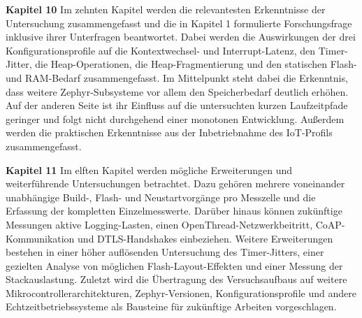 \noindent\textbf{Kapitel 10}\quad
Im zehnten Kapitel werden die relevantesten Erkenntnisse der Untersuchung zusammengefasst und die in Kapitel 1 formulierte Forschungsfrage inklusive ihrer Unterfragen beantwortet. Dabei werden die Auswirkungen der drei Konfigurationsprofile auf die Kontextwechsel- und Interrupt-Latenz, den Timer-Jitter, die Heap-Operationen, die Heap-Fragmentierung und den statischen Flash- und RAM-Bedarf zusammengefasst. Im Mittelpunkt steht dabei die Erkenntnis, dass weitere Zephyr-Subsysteme vor allem den Speicherbedarf deutlich erh{\"o}hen. Auf der anderen Seite ist ihr Einfluss auf die untersuchten kurzen Laufzeitpfade geringer und folgt nicht durchgehend einer monotonen Entwicklung. Au{\ss}erdem werden die praktischen Erkenntnisse aus der Inbetriebnahme des IoT-Profils zusammengefasst.

\noindent\textbf{Kapitel 11}\quad
Im elften Kapitel werden m{\"o}gliche Erweiterungen und weiterf{\"u}hrende Untersuchungen betrachtet. Dazu geh{\"o}ren mehrere voneinander unabh{\"a}ngige Build-, Flash- und Neustartvorg{\"a}nge pro Messzelle und die Erfassung der kompletten Einzelmesswerte. Dar{\"u}ber hinaus k{\"o}nnen zuk{\"u}nftige Messungen aktive Logging-Lasten, einen OpenThread-Netzwerkbeitritt, CoAP-Kommunikation und DTLS-Handshakes einbeziehen. Weitere Erweiterungen bestehen in einer h{\"o}her aufl{\"o}senden Untersuchung des Timer-Jitters, einer gezielten Analyse von m{\"o}glichen Flash-Layout-Effekten und einer Messung der Stackauslastung. Zuletzt wird die {\"U}bertragung des Versuchsaufbaus auf weitere Mikrocontrollerarchitekturen, Zephyr-Versionen, Konfigurationsprofile und andere Echtzeitbetriebssysteme als Bausteine f{\"u}r zuk{\"u}nftige Arbeiten vorgeschlagen.
